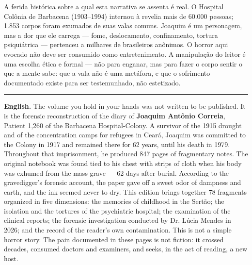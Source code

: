 \vspace{0.8em}

\vspace{0.8em}
\noindent A ferida histórica sobre a qual esta narrativa se assenta é real. O Hospital Colônia de Barbacena (1903--1994) internou à revelia mais de 60.000 pessoas; 1.853 corpos foram exumados de suas valas comuns. Joaquim é um personagem, mas a dor que ele carrega --- fome, deslocamento, confinamento, tortura psiquiátrica --- pertenceu a milhares de brasileiros anônimos. O horror aqui evocado não deve ser consumido como entretenimento. A manipulação do leitor é uma escolha ética e formal --- não para enganar, mas para fazer o corpo sentir o que a mente sabe: que a vala não é uma metáfora, e que o sofrimento documentado existe para ser testemunhado, não estetizado.

\vspace{0.8em}

\vspace{1.2em}
\noindent\rule{\textwidth}{0.5pt}
\vspace{0.8em}

\noindent\textbf{English.} The volume you hold in your hands was not written to be published. It is the forensic reconstruction of the diary of \textbf{Joaquim Antônio Correia}, Patient 1,260 of the Barbacena Hospital-Colony. A survivor of the 1915 drought and of the concentration camps for refugees in Ceará, Joaquim was committed to the Colony in 1917 and remained there for 62 years, until his death in 1979. Throughout that imprisonment, he produced 847 pages of fragmentary notes. The original notebook was found tied to his chest with strips of cloth when his body was exhumed from the mass grave --- 62 days after burial. According to the gravedigger's forensic account, the paper gave off a sweet odor of dampness and earth, and the ink seemed never to dry. This edition brings together 78 fragments organized in five dimensions: the memories of childhood in the Sertão; the isolation and the tortures of the psychiatric hospital; the examination of the clinical reports; the forensic investigation conducted by Dr. Lúcia Mendes in 2026; and the record of the reader's own contamination. This is not a simple horror story. The pain documented in these pages is not fiction: it crossed decades, consumed doctors and examiners, and seeks, in the act of reading, a new host.

